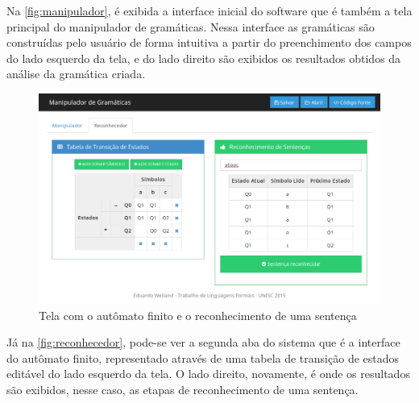 \documentclass[12pt]{article}
\begin{document}
Na \autoref{fig:manipulador}, é exibida a interface inicial do software que é também a tela principal do manipulador
de gramáticas. Nessa interface as gramáticas são construídas pelo usuário de forma intuitiva a partir do preenchimento
dos campos do lado esquerdo da tela, e do lado direito são exibidos os resultados obtidos da análise da gramática criada.

\begin{figure}[ht]
  \centering
  \includegraphics[width=\textwidth]{images/reconhecedor.png}
  \caption{Tela com o autômato finito e o reconhecimento de uma sentença}
  \label{fig:reconhecedor}
\end{figure}

Já na \autoref{fig:reconhecedor}, pode-se ver a segunda aba do sistema que é a interface do autômato finito, representado
através de uma tabela de transição de estados editável do lado esquerdo da tela. O lado direito, novamente, é onde os
resultados são exibidos, nesse caso, as etapas de reconhecimento de uma sentença.





\end{document}
